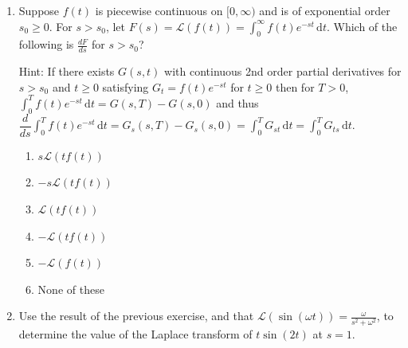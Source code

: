\documentclass{ximera}
\begin{document}
\begin{enumerate}[label=(\arabic*)]
\newpage

\item Suppose $f(t)$ is piecewise continuous on $[0,\infty)$ and is of exponential order $s_0\geq 0$.  For $s>s_0$, let $\displaystyle F(s)=\mathcal{L}(f(t))=\int_0^{\infty} f(t)e^{-st}\,\mathrm{d}t$.   Which of the following is $\displaystyle \frac{dF}{ds}$ for $s>s_0$? 


    Hint:  If there exists $G(s,t)$ with continuous 2nd order partial derivatives for $s>s_0$ and $t\geq 0$ satisfying $G_t=f(t)e^{-st}$ for $t\geq 0$ then for $T>0$, $\displaystyle \int_0^{T} f(t)e^{-st}\,\mathrm{d}t=G(s,T)-G(s,0)$ and thus \\$\displaystyle \dfrac{d}{ds}\displaystyle \int_0^{T} f(t)e^{-st}\,\mathrm{d}t=G_s(s,T)-G_s(s,0)=\int_0^T G_{st}\,\mathrm{d}t=\int_0^T G_{ts}\,\mathrm{d}t$.


\begin{enumerate}[label=(\alph*)]
\item $\displaystyle s\mathcal{L}(tf(t))$
\item $\displaystyle -s\mathcal{L}(tf(t))$
\item $\displaystyle \mathcal{L}(tf(t))$
\item $\displaystyle -\mathcal{L}(tf(t))$ %
\item $\displaystyle -\mathcal{L}(f(t))$
\item None of these
\end{enumerate}



\item  Use the result of the previous exercise, and that $\displaystyle \mathcal{L}\left(\sin{(\omega t)}\right)=\frac{\omega}{s^2+\omega^2}$, to determine the value of the Laplace transform of $t\sin{(2t)}$ at $s=1$.  



\end{enumerate}
\end{document}
